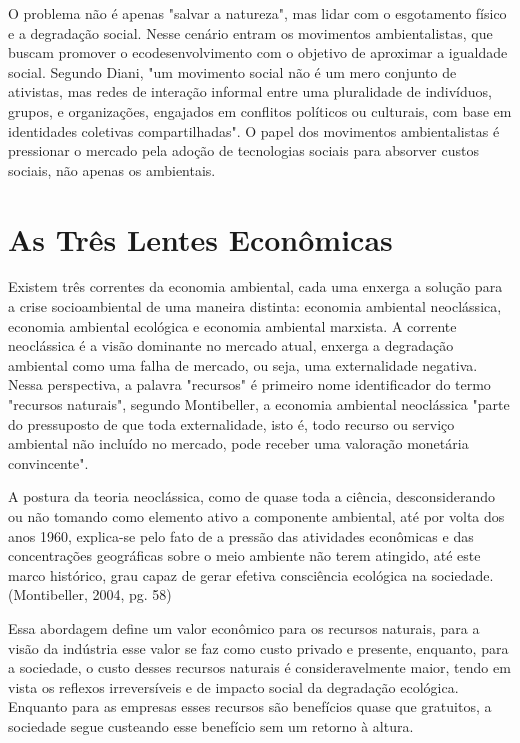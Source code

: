 \documentclass[12pt, a4paper]{article}
\newenvironment{citacao}{
  \vspace{0.5cm} %
  \small %
  \begin{list}{}{
    \leftmargin=4cm %
    \rightmargin=0cm
    \parsep=0pt
    \topsep=0pt
    \partopsep=0pt
  }
  \item\relax
  \linespread{1.0}\selectfont %
}{
  \end{list}
  \vspace{0.5cm} %
}
\begin{document}
	O problema não é apenas "salvar a natureza", mas lidar com o esgotamento físico e a degradação social. Nesse cenário entram os movimentos ambientalistas, que buscam promover o ecodesenvolvimento com o objetivo de aproximar a igualdade social. Segundo Diani, "um movimento social não é um mero conjunto de ativistas, mas  redes de interação informal entre uma pluralidade de indivíduos, grupos, e organizações, engajados em conflitos políticos ou culturais, com base em identidades coletivas compartilhadas". O papel dos movimentos ambientalistas é pressionar o mercado pela adoção de tecnologias sociais para absorver custos sociais, não apenas os ambientais.

\section{As Três Lentes Econômicas}
	Existem três correntes da economia ambiental, cada uma enxerga a solução para a crise socioambiental de uma maneira distinta: economia ambiental neoclássica, economia ambiental ecológica e economia ambiental marxista. A corrente neoclássica é a visão dominante no mercado atual, enxerga a degradação ambiental como uma falha de mercado, ou seja, uma externalidade negativa. Nessa perspectiva, a palavra "recursos" é primeiro nome identificador do termo "recursos naturais", segundo Montibeller, a economia ambiental neoclássica "parte do pressuposto de que toda externalidade, isto é, todo recurso ou serviço ambiental não incluído no mercado, pode receber uma valoração monetária convincente".

	\begin{citacao}
		A postura da teoria neoclássica, como de quase toda a ciência, desconsiderando ou não tomando como elemento ativo a componente ambiental, até por volta dos anos 1960, explica-se pelo fato de a pressão das atividades econômicas e das concentrações geográficas sobre o meio ambiente não terem atingido, até este marco histórico, grau capaz de gerar efetiva consciência ecológica na sociedade. (Montibeller, 2004, pg. 58)
	\end{citacao}

	Essa abordagem define um valor econômico para os recursos naturais, para a visão da indústria esse valor se faz como custo privado e presente, enquanto, para a sociedade, o custo desses recursos naturais é consideravelmente maior, tendo em vista os reflexos irreversíveis e de impacto social da degradação ecológica. Enquanto para as empresas esses recursos são benefícios quase que gratuitos, a sociedade segue custeando esse benefício sem um retorno à altura.
\\
	
\end{document}
